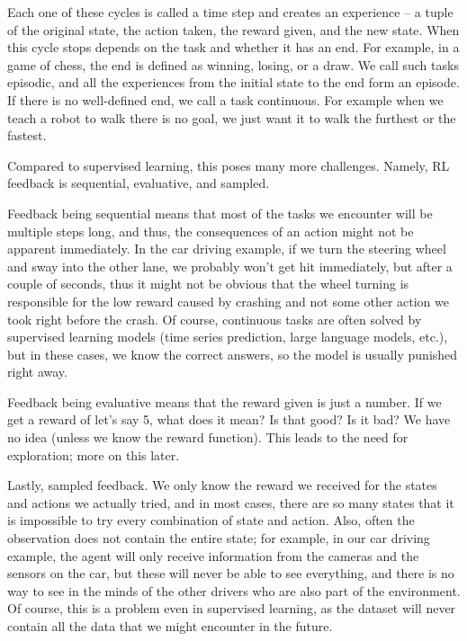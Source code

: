 \documentclass[
  digital,     %
  oneside,     %
  nosansbold,  %
  nocolorbold, %
  lof,         %
  lot,         %
]{fithesis4}
\begin{document}
Each one of these cycles is called a time step and creates an experience -- a tuple of the original state, the action taken, the reward given, and the new state. When this cycle stops depends on the task and whether it has an end. For example, in a game of chess, the end is defined as winning, losing, or a draw. We call such tasks episodic, and all the experiences from the initial state to the end form an episode. If there is no well-defined end, we call a task continuous. For example when we teach a robot to walk there is no goal, we just want it to walk the furthest or the fastest.

Compared to supervised learning, this poses many more challenges. Namely, RL feedback is sequential, evaluative, and sampled.

Feedback being sequential means that most of the tasks we encounter will be multiple steps long, and thus, the consequences of an action might not be apparent immediately. In the car driving example, if we turn the steering wheel and sway into the other lane, we probably won’t get hit immediately, but after a couple of seconds, thus it might not be obvious that the wheel turning is responsible for the low reward caused by crashing and not some other action we took right before the crash. Of course, continuous tasks are often solved by supervised learning models (time series prediction, large language models, etc.), but in these cases, we know the correct answers, so the model is usually punished right away.

Feedback being evaluative means that the reward given is just a number. If we get a reward of let’s say 5, what does it mean? Is that good? Is it bad? We have no idea (unless we know the reward function). This leads to the need for exploration; more on this later.

Lastly, sampled feedback. We only know the reward we received for the states and actions we actually tried, and in most cases, there are so many states that it is impossible to try every combination of state and action. Also, often the observation does not contain the entire state; for example, in our car driving example, the agent will only receive information from the cameras and the sensors on the car, but these will never be able to see everything, and there is no way to see in the minds of the other drivers who are also part of the environment. Of course, this is a problem even in supervised learning, as the dataset will never contain all the data that we might encounter in the future. \cite{GDRL}
\end{document}
